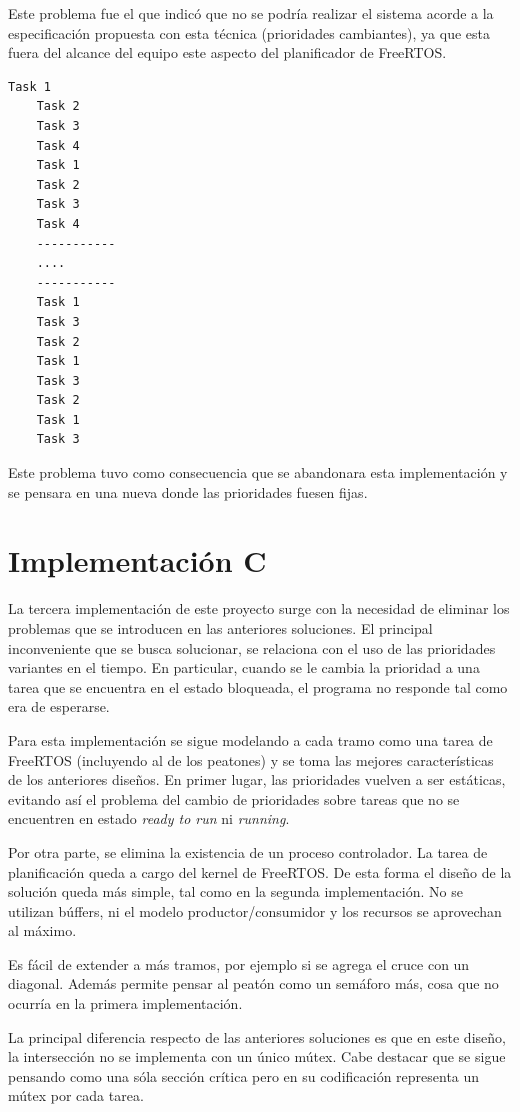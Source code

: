 Este problema fue el que indicó que no se podría realizar el sistema acorde a la especificación propuesta con esta técnica (prioridades cambiantes), ya que esta fuera del alcance del equipo este aspecto del planificador de FreeRTOS.

\begin{lstlisting}[float, label=lst:output-win32, caption=Salida del programa de prueba escrito para Win32.]
	Task 1
	Task 2
	Task 3
	Task 4
	Task 1
	Task 2
	Task 3
	Task 4
	-----------
	....
	-----------
	Task 1
	Task 3
	Task 2
	Task 1
	Task 3
	Task 2
	Task 1
	Task 3
\end{lstlisting}

Este problema tuvo como consecuencia que se abandonara esta implementación y se pensara en una nueva donde las prioridades fuesen fijas.



\section{Implementación C}
La tercera implementación de este proyecto surge con la necesidad de eliminar los problemas que se introducen en las anteriores soluciones.
El principal inconveniente que se busca solucionar, se relaciona con el uso de las prioridades variantes en el tiempo.
En particular, cuando se le cambia la prioridad a una tarea que se encuentra en el estado bloqueada, el programa no responde tal como era de esperarse.

Para esta implementación se sigue modelando a cada tramo como una tarea de FreeRTOS (incluyendo al de los peatones) y se toma las mejores características de los anteriores diseños.
En primer lugar, las prioridades vuelven a ser estáticas, evitando así el problema del cambio de prioridades sobre tareas que no se encuentren en estado \emph{ready to run} ni \emph{running}.

Por otra parte, se elimina la existencia de un proceso controlador.
La tarea de planificación queda a cargo del kernel de FreeRTOS.
De esta forma el diseño de la solución queda más simple, tal como en la segunda implementación.
No se utilizan búffers, ni el modelo productor/consumidor y los recursos se aprovechan al máximo.

Es fácil de extender a más tramos, por ejemplo si se agrega el cruce con un diagonal.
Además permite pensar al peatón como un semáforo más, cosa que no ocurría en la primera implementación.

La principal diferencia respecto de las anteriores soluciones es que en este diseño, la intersección no se implementa con un único mútex.
Cabe destacar que se sigue pensando como una sóla sección crítica pero en su codificación representa un mútex por cada tarea.

